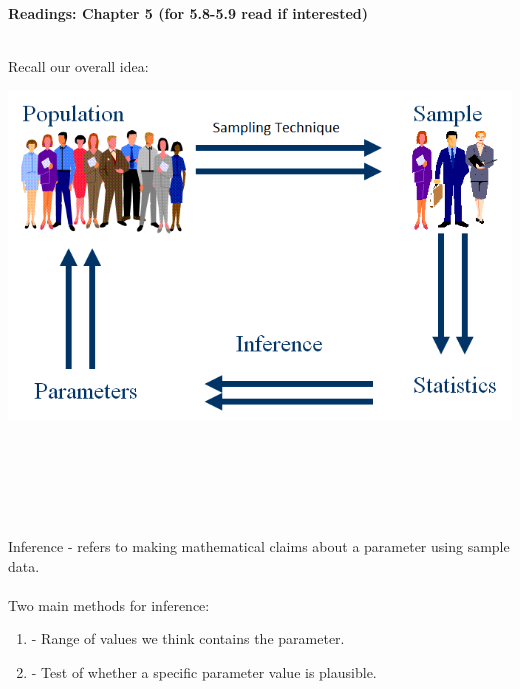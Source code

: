 \begin{center}\large\textbf{Readings: Chapter 5 (for 5.8-5.9 read if interested)}\\
\normalsize \end{center}
\large ~\hrulefill
~\\
\normalsize Recall our overall idea:
\begin{center}
\includegraphics[scale=0.55]{paradigm}
\end{center}

~\\~\\~\\~\\~\\
Inference - refers to making mathematical claims about a parameter using sample data.\\~\\
Two main methods for inference:\\
\begin{enumerate}
\item \underbar{~~~~~~~~~~~~~~~~~~~~~~~~~~~~~~~~~~~~~~~~~~~~~~~~~~~} - Range of values we think contains the parameter.\\
\item \underbar{~~~~~~~~~~~~~~~~~~~~~~~~~~~~~~~~~~~~~~~~~~~~~~~~~~~} - Test of whether a specific parameter value is plausible.  
\end{enumerate}

\newpage

